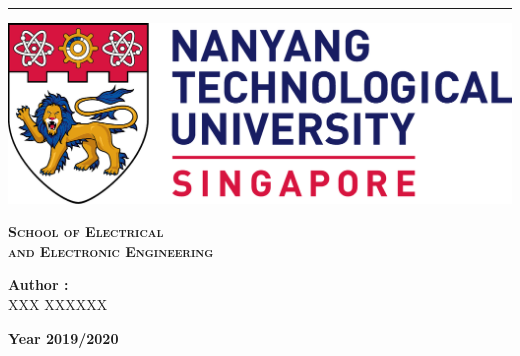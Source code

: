 \begin{titlepage}

    \begin{minipage}[t]{0.1\textwidth}
    \end{minipage}
    \rule[-400pt]{1.0pt}{600pt}
    \hspace*{0.05\textwidth} %
    \begin{minipage}{0.9\textwidth}
        \begin{center}
        
        \vspace{1cm}
        
        \includegraphics[width=1.0\textwidth]{./figures/ntu_logo.png}
        
        \vspace{1cm}
        
        \Large{\textsc{\bfseries School of Electrical \\and Electronic Engineering}}
        
        \vspace{1.5cm}
        
        \textbf{Author :} \\
        XXX XXXXXX
        
        \vspace{80pt}
        
        \textbf{Year 2019/2020}
        
        \end{center}
    \end{minipage}
   \pagestyle{empty} %
\end{titlepage}